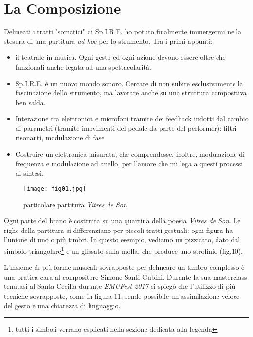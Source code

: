
\chapter{La Composizione}
\label{chp:La Composizione}

Delineati i tratti "somatici" di Sp.I.R.E. ho potuto finalmente immergermi nella stesura di una partitura \textit{ad hoc} per lo strumento. Tra i primi appunti:

\begin{itemize}
\item{il teatrale in musica. Ogni gesto ed ogni azione devono essere oltre che funzionali anche legata ad una spettacolarità.}
\item{Sp.I.R.E. è un nuovo mondo sonoro. Cercare di non subire esclusivamente la fascinazione dello strumento, ma lavorare anche su una struttura compositiva ben salda.}
\item{Interazione tra elettronica e microfoni tramite dei feedback indotti dal cambio di parametri (tramite imovimenti del pedale da parte del performer): filtri risonanti, modulazione di fase}
\item{Costruire un elettronica misurata, che comprendesse, inoltre, modulazione di frequenza e modulazione ad anello, per l'amore che mi lega a questi processi di sintesi.}
\end{itemize}

\begin{wrapfigure}{r}{5cm}
\centering
\texttt{[image: fig01.jpg]}
\caption{particolare partitura \textit{Vitres de Son}}
\label{default}
\end{wrapfigure}

Ogni parte del brano è costruita su una quartina della poesia \textit{Vitres de Son}. Le righe della partitura si differenziano per piccoli tratti gestuali: ogni figura ha l'unione di uno o più timbri. In questo esempio, vediamo un pizzicato, dato dal simbolo triangolare\footnote{tutti i simboli verrano esplicati nella sezione dedicata alla legenda} e un glissato sulla molla, che produce uno strofinio (fig.10). 

L'insieme di più forme musicali sovrapposte per delineare un timbro complesso è una pratica cara al compositore Simone Santi Gubini. Durante la sua masterclass tenutasi al Santa Cecilia durante \textit{EMUFest 2017} ci spiegò che l'utilizzo di più tecniche sovrapposte, come in figura 11, rende possibile un'assimilazione veloce del gesto e una chiarezza di linguaggio. 


